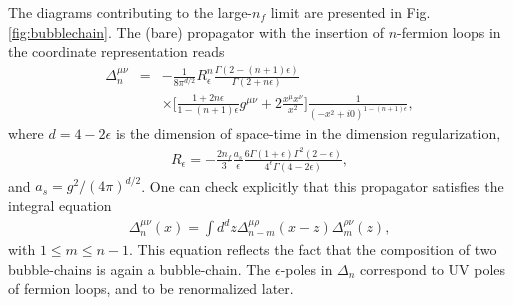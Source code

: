 \documentclass[aps,prd,twocolumn,a4paper,superscriptaddress,10pt,showpacs,notitlepage,floatfix]{revtex4-1}
\begin{document}
The diagrams contributing to the large-$n_f$ limit are presented in Fig.\ref{fig:bubblechain}. 
The (bare) propagator with the insertion of $n$-fermion loops in the coordinate representation reads
\begin{eqnarray}
\Delta_n^{\mu\nu}&=&-\frac{1}{8\pi^{d/2}}R_\epsilon^n\frac{\Gamma(2-(n+1)\epsilon)}{\Gamma(2+n\epsilon)}
\\\nonumber &&
\times\Big[\frac{1+2n\epsilon}{1-(n+1)\epsilon}g^{\mu\nu}+2\frac{x^\mu x^\nu}{x^2}\Big]\frac{1}{(-x^2+i0)^{1-(n+1)\epsilon}},
\end{eqnarray}
where $d=4-2\epsilon$ is the dimension of space-time in the dimension regularization, 
\begin{eqnarray}
R_\epsilon=-\frac{2n_f}{3}\frac{a_s}{\epsilon}\frac{6\Gamma(1+\epsilon)\Gamma^2(2-\epsilon)}{4^\epsilon\Gamma(4-2\epsilon)},
\end{eqnarray}
and $a_s=g^2/(4\pi)^{d/2}$. One can check explicitly that this propagator satisfies the integral equation
\begin{eqnarray}
\Delta_{n}^{\mu\nu}(x)=\int d^dz \Delta^{\mu\rho}_{n-m}(x-z)\Delta^{\rho\nu}_m(z),
\end{eqnarray}
with $1\leqslant m \leqslant n-1$. This equation reflects the fact that the composition of two bubble-chains is again a bubble-chain. The $\epsilon$-poles in $\Delta_n$ correspond to UV poles of fermion loops, and to be renormalized later.
\end{document}
